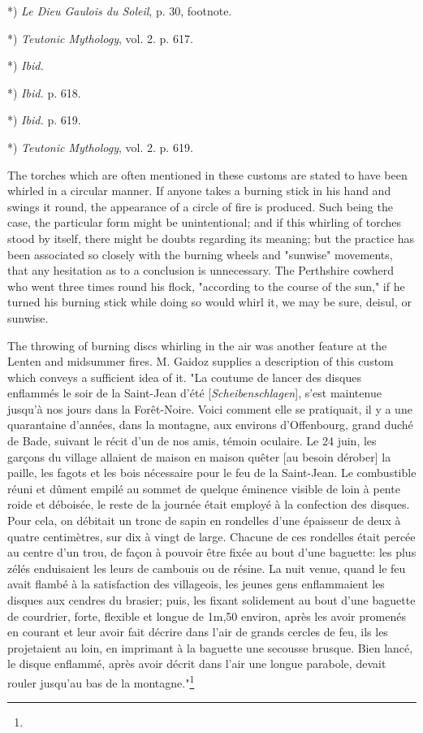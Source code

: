 \documentclass[a4paper, 11pt, oneside, polutonikogreek, english]{article}
\begin{document}
*) \emph{Le Dieu Gaulois du Soleil}, p. 30, footnote.

*) \emph{Teutonic Mythology}, vol. 2. p. 617.

*) \emph{Ibid.}

*) \emph{Ibid.} p. 618.

*) \emph{Ibid.} p. 619.

*) \emph{Teutonic Mythology}, vol. 2. p. 619.

The torches which are often mentioned in these customs are stated to have been whirled in a circular manner. If anyone takes a burning stick in his hand and swings it round, the appearance of a circle of fire is produced. Such being the case, the particular form might be unintentional; and if this whirling of torches stood by itself, there might be doubts regarding its meaning; but the practice has been associated so closely with the burning wheels and "sunwise" movements, that any hesitation as to a conclusion is unnecessary. The Perthshire cowherd who went three times round his flock, "according to the course of the sun," if he turned his burning stick while doing so would whirl it, we may be sure, deisul, or sunwise.

The throwing of burning discs whirling in the air was another feature at the Lenten and midsummer fires. M. Gaidoz supplies a description of this custom which conveys a sufficient idea of it. "La coutume de lancer des disques enflammés le soir de la Saint-Jean d'été [\emph{Scheibenschlagen}], s'est maintenue jusqu'à nos jours dans la Forêt-Noire. Voici comment elle se pratiquait, il y a une quarantaine d'années, dans la montagne, aux environs d'Offenbourg, grand duché de Bade, suivant le récit d'un de nos amis, témoin oculaire. Le 24 juin, les garçons du village allaient de maison en maison quêter [au besoin dérober] la paille, les fagots et les bois nécessaire pour le feu de la Saint-Jean. Le combustible réuni et dûment empilé au sommet de quelque éminence visible de loin à pente roide et déboisée, le reste de la journée était employé à la confection des disques. Pour cela, on débitait un tronc de sapin en rondelles d'une épaisseur de deux à quatre centimètres, sur dix à vingt de large. Chacune de ces rondelles était percée au centre d'un trou, de façon à pouvoir être fixée au bout d'une baguette: les plus zélés enduisaient les leurs de cambouis ou de résine. La nuit venue, quand le feu avait flambé à la satisfaction des villageois, les jeunes gens enflammaient les disques aux cendres du brasier; puis, les fixant solidement au bout d'une baguette de courdrier, forte, flexible et longue de 1m,50 environ, après les avoir promenés en courant et leur avoir fait décrire dans l'air de grands cercles de feu, ils les projetaient au loin, en imprimant à la baguette une secousse brusque. Bien lancé, le disque enflammé, après avoir décrit dans l'air une longue parabole, devait rouler jusqu'au bas de la montagne."\footnote{}
\end{document}
